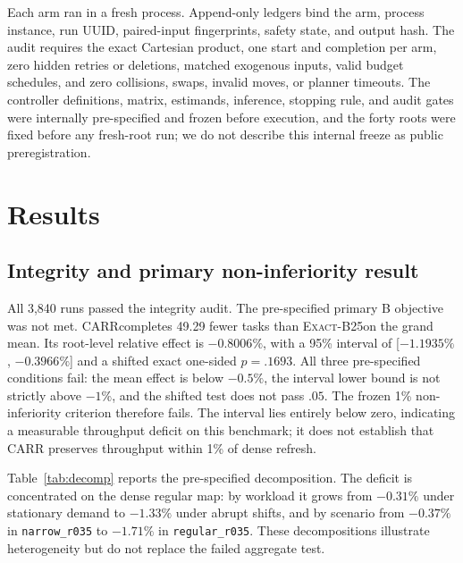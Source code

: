 \documentclass[sigconf,anonymous,review]{acmart}
\newcommand{\carr}{\textsc{CARR}}
\newcommand{\exactdense}{\textsc{Exact-B25}}
\begin{document}
Each arm ran in a fresh process. Append-only ledgers bind the arm, process
instance, run UUID, paired-input fingerprints, safety state, and output hash.
The audit requires the exact Cartesian product, one start and completion per
arm, zero hidden retries or deletions, matched exogenous inputs, valid budget
schedules, and zero collisions, swaps, invalid moves, or planner timeouts.
The controller definitions, matrix, estimands, inference, stopping
rule, and audit gates were internally pre-specified and frozen before
execution, and the forty roots were fixed before any fresh-root run; we do not
describe this internal freeze as public preregistration.

\section{Results}

\subsection{Integrity and primary non-inferiority result}

All 3{,}840 runs passed the integrity audit. The pre-specified primary B
objective was not met. \carr completes 49.29 fewer tasks than \exactdense on
the grand mean. Its root-level relative effect is $-0.8006\%$, with a 95\%
interval of [$-1.1935\%$, $-0.3966\%$] and a shifted exact one-sided
$p=.1693$. All three pre-specified conditions fail: the mean effect is below
$-0.5\%$, the interval lower bound is not strictly above $-1\%$, and the
shifted test does not pass $.05$. The frozen 1\% non-inferiority criterion
therefore fails. The interval lies entirely below zero, indicating a measurable
throughput deficit on this benchmark; it does not establish that \carr
preserves throughput within 1\% of dense refresh.

Table~\ref{tab:decomp} reports the pre-specified decomposition. The deficit is
concentrated on the dense regular map: by workload it grows from $-0.31\%$ under
stationary demand to $-1.33\%$ under abrupt shifts, and by scenario from
$-0.37\%$ in \texttt{narrow\_r035} to $-1.71\%$ in \texttt{regular\_r035}. These
decompositions illustrate heterogeneity but do not replace the failed aggregate
test.
\end{document}
